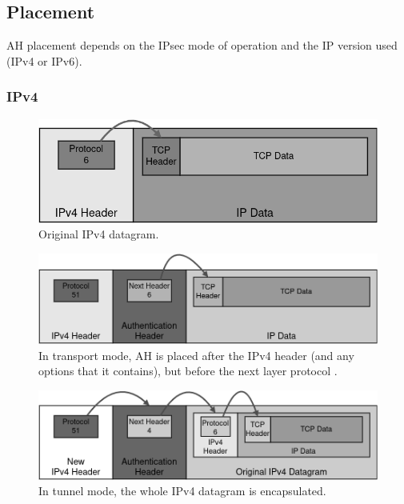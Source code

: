 \documentclass[a4paper,12pt]{report}
\begin{document}
		\newpage
		\subsection{Placement}
		AH placement depends on the IPsec mode of operation and the IP version used (IPv4 or IPv6).
		\subsubsection{IPv4}
		\begin{figure}[h]
			\includegraphics[width=\textwidth,height=0.14\textheight,keepaspectratio]{original_ipv4_packet}
			\centering
			\caption{Original IPv4 datagram.}
		\end{figure}
		
		\begin{figure}[h]
			\includegraphics[width=\textwidth]{ah_ipv4_transport}
			\centering
			\caption{In transport mode, AH is placed after the IPv4 header (and any options that it contains), but before the next layer protocol \cite{rfc4302}.}
		\end{figure}
		
		\begin{figure}[!h]
			\includegraphics[width=\textwidth]{ah_ipv4_tunnel}
			\centering
			\caption{In tunnel mode, the whole IPv4 datagram is encapsulated.}
		\end{figure}
		
\end{document}
